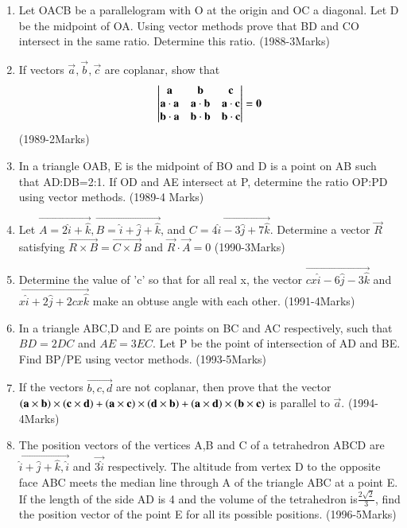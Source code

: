 \documentclass[journal,12pt,twocolumn]{IEEEtran}
\theoremstyle{remark}
\begin{document}
\begin{enumerate}
\item Let OACB be a parallelogram with O at the origin and OC a diagonal. Let D be the midpoint of OA. Using vector methods prove that BD and CO intersect in the same ratio. Determine this ratio. \hfill{(1988-3Marks)}\\ 

\item If vectors $\vec{a},\vec{b},\vec{c}$ are coplanar, show that\\
	\[
		\begin{vmatrix}
\mathbf{a} & \mathbf{b} & \mathbf{c} \\
\mathbf{a}\cdot\mathbf{a} & \mathbf{a}\cdot\mathbf{b} & \mathbf{a}\cdot\mathbf{c} \\
\mathbf{b}\cdot\mathbf{a} & \mathbf{b}\cdot\mathbf{b} & \mathbf{b}\cdot\mathbf{c}
 \end{vmatrix}=\mathbf{0}
\] \hfill{(1989-2Marks)}\\

\item In a triangle OAB, E is the midpoint of BO and D is a point on AB such that AD:DB=2:1. If OD and AE intersect at P, determine the ratio OP:PD  using vector methods. \hfill{(1989-4 Marks)}\\

\item Let $\vec{A=2\hat{i}+\hat{k}},\vec{B=\hat{i}+\hat{j}+\hat{k}}$, and $\vec{C=4\hat{i}-3\hat{j}+7\hat{k}}$. Determine a vector $\vec{R}$ satisfying $\vec{R\times B}=\vec{C\times B}$ and $\vec{R}\cdot\vec{A}=0$ \hfill{(1990-3Marks)}\\

\item Determine the value of 'c' so that for all real x, the vector $\vec{cx\hat{i}-6\hat{j}-3\hat{k}}$ and $\vec{x\hat{i}+2\hat{j}+2cx\hat{k}}$ make an obtuse angle with each other. \hfill{(1991-4Marks)}\\

\item In a triangle ABC,D and E are points on BC and AC respectively, such that $BD=2DC$ and $AE=3EC$. Let P be the point of intersection of AD and BE. Find BP/PE using vector methods. \hfill{(1993-5Marks)}\\

\item If the vectors $\vec{b,c,d}$ are not coplanar, then prove that the vector $\mathbf{\left(a\times b\right)\times\left(c\times d\right)}+\mathbf{\left(a\times c\right)\times\left(d\times b\right)}+\mathbf{\left(a\times d\right)\times\left(b\times c\right)}$ is parallel to $\vec{a}$. \hfill{(1994-4Marks)}\\

\item The position vectors of the vertices A,B and C of a tetrahedron ABCD are $\vec{\hat{i}+\hat{j}+\hat{k},\hat{i}}$ and $\vec{3\hat{i}}$ respectively. The altitude from vertex D to the opposite face ABC meets the median line through A of the triangle ABC at a point E. If the length of the side AD is 4 and the volume of the tetrahedron is$\frac{2\sqrt{2}}{3}$, find the position vector of the point E for all its possible positions. \hfill{(1996-5Marks)}


\end{enumerate}
\end{document}
